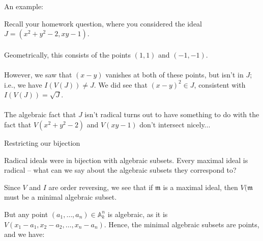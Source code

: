 \documentclass{beamer}
\newcommand{\AAA}{\mathbb{A}}
\begin{document}
\begin{frame}{An example:}

Recall your homework question, where you considered the ideal $J=(x^2+y^2-2, xy-1)$. \\~\\

Geometrically, this consists of the points $(1,1)$ and $(-1,-1)$. \\~\\

However, we saw that $(x-y)$ vanishes at both of these points, but isn't in $J$; i.e., we have  $I(V(J))\neq J$.  We did see that $(x-y)^2\in J$, consistent with $I(V(J))=\sqrt{J}$.  \\~\\

The algebraic fact that $J$ isn't radical turns out to have something to do with the fact that $V(x^2+y^2-2)$ and $V(xy-1)$ don't intersect nicely...




\end{frame}

\begin{frame}{Restricting our bijection}

Radical ideals were in bijection with algebraic subsets.  Every maximal ideal is radical -- what can we say about the algebraic subsets they correspond to?

Since $V$ and $I$ are order reversing, we see that if $\mathfrak{m}$ is a maximal ideal, then $V(\mathfrak{m}$ must be a minimal algebraic subset.  

But any point $(a_1,\dots, a_n)\in\AAA_k^n$ is algebraic, as it is $V(x_1-a_1, x_2-a_2,\dots, x_n-a_n)$.  Hence, the minimal algebraic subsets are points, and we have:

\begin{center}
\end{center}

\end{frame}
\end{document}
